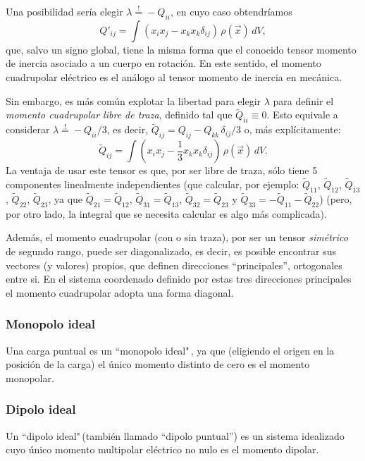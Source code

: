 Una posibilidad sería elegir $\lambda\stackrel{!}{=}-Q_{ii}$, en cuyo caso obtendríamos
\begin{equation}
 \boxed{Q'_{ij}=\int
(x_ix_j-x_kx_k\delta_{ij})\,\rho(\vec{x})\,dV,}
\end{equation}
que, salvo un signo global, tiene la misma forma que el conocido tensor momento de inercia asociado a un cuerpo en rotación. En este sentido, el momento cuadrupolar eléctrico es el análogo al tensor momento de inercia en mecánica.

Sin embargo, es más común explotar la libertad para elegir $\lambda$ para definir el  \textit{momento cuadrupolar libre de traza}, definido tal que $\tilde{Q}_{ii}\equiv 0$. Esto equivale a considerar $\lambda\stackrel{!}{=}-Q_{ii}/3$, es decir, $\tilde{Q}_{ij}=Q_{ij}-Q_{kk}\,\delta_{ij}/3$ o,
más explícitamente:
\begin{equation}
 \boxed{\tilde{Q}_{ij}=\int
(x_ix_j-\frac{1}{3}x_kx_k\delta_{ij})\,\rho(\vec{x})\,dV.} \label{mom4st}
\end{equation}
La ventaja de usar este tensor es que, por ser libre de traza, sólo tiene 5
componentes linealmente independientes (que calcular, por ejemplo:
$\tilde{Q}_{11}$, $\tilde{Q}_{12}$, $\tilde{Q}_{13}$, $\tilde{Q}_{22}$,
$\tilde{Q}_{23}$, ya que $\tilde{Q}_{21}=\tilde{Q}_{12}$,
$\tilde{Q}_{31}=\tilde{Q}_{13}$, $\tilde{Q}_{32}=\tilde{Q}_{23}$ y
$\tilde{Q}_{33}=-\tilde{Q}_{11}-\tilde{Q}_{22}$) (pero, por otro lado, la integral que se necesita calcular es algo más complicada).

Además, el momento cuadrupolar (con o sin traza), por ser un tensor \textit{simétrico} de segundo rango, puede ser diagonalizado, es decir, es posible encontrar sus vectores (y valores) propios, que definen direcciones ``principales'', ortogonales entre si. En el sistema coordenado definido por estas tres direcciones principales el momento cuadrupolar adopta una forma diagonal.


\subsubsection{Monopolo ideal}
Una carga puntual es un ``monopolo ideal"\,, ya que (eligiendo el origen en la posición de la carga) el único momento distinto de cero es el momento monopolar. 

\subsubsection{Dipolo ideal}
Un ``dipolo ideal"\,(también llamado ``dipolo puntual'') es un sistema idealizado cuyo único momento multipolar eléctrico no nulo es el momento dipolar.

